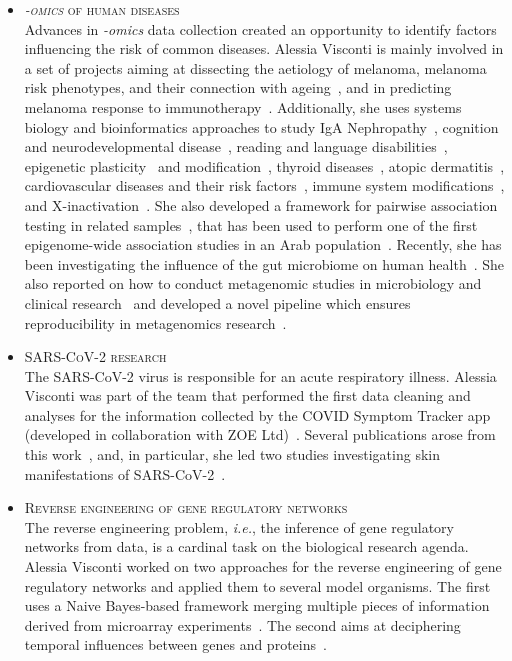 \documentclass[a4paper,10pt]{article}
\newcommand{\smalltitle}[1]{
	\vspace{0.1cm}
	{\noindent 
	\large \textsc{#1}}
	\vspace{0.1cm}
}
\newcommand{\bulletitem}{\item[$\bullet$]}
\begin{document}
\begin{itemize}
	
\bulletitem \smalltitle{\emph{-omics} of human diseases}\\
Advances in \emph{-omics} data collection created an opportunity to identify factors influencing the risk of common diseases. Alessia Visconti is mainly involved in a set of projects aiming at dissecting the aetiology of melanoma, melanoma risk phenotypes, and their connection with ageing~\cite{Rib16,Pui16,Hys18,Vis18a,Duf17,Vis19a,Vis20,Lan20,San20,Swi15}, and in predicting melanoma response to immunotherapy~\cite{Ros22,Vis23}.
Additionally, she uses systems biology and bioinformatics approaches to study IgA Nephropathy~\cite{Lom16,Dot21}, cognition and neurodevelopmental disease~\cite{Joh15,Cul18}, reading and language disabilities~\cite{Gia16}, epigenetic plasticity~\cite{Car16} and modification~\cite{Zag18}, thyroid diseases~\cite{Mar20}, atopic dermatitis~\cite{Gro21,Bud22}, cardiovascular diseases and their risk factors~\cite{Ros21}, immune system modifications~\cite{Pia21}, and X-inactivation~\cite{Zit23}. 
She also developed a framework for pairwise association testing in related samples~\cite{Vis16}, that has been used to perform one of the first epigenome-wide association studies in an Arab population~\cite{AlM15}. 
Recently, she has been investigating the influence of the gut microbiome on human health~\cite{Vis19,Bar20,LeR22,Zha22,Val23,Lou23}. She also reported on how to conduct metagenomic studies in microbiology and clinical research~\cite{Vis18c} and developed a novel pipeline which ensures reproducibility in metagenomics research~\cite{Vis18b}.

\bulletitem \smalltitle{SARS-CoV-2 research}\\
The SARS-CoV-2 virus is responsible for an acute respiratory illness.
Alessia Visconti was part of the team that performed the first data cleaning and analyses for the information collected by the COVID Symptom Tracker app (developed in collaboration with ZOE Ltd)~\cite{Mur21}. Several publications arose from this work~\cite{Men20,Lee20, Zaz20,Hop21,Wil21,Sud21}, and, in particular, she led two studies investigating skin manifestations of SARS-CoV-2~\cite{Vis21, Vis22}.

\bulletitem \smalltitle{Reverse engineering of gene regulatory networks}\\
The reverse engineering problem, \emph{i.e.}, the inference of gene regulatory networks from data, is a cardinal task on the biological research agenda.
Alessia Visconti worked on two approaches for the reverse engineering of gene regulatory networks and applied them to several model organisms. The first uses a Naive Bayes-based framework merging multiple pieces of information derived from microarray experiments~\cite{Mar12, Vis11b}. The second aims at deciphering temporal influences between genes and proteins~\cite{Vis12b}. 


\end{itemize}
\end{document}
